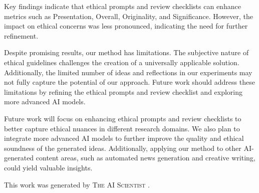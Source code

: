 \documentclass{article} %
\begin{document}
Key findings indicate that ethical prompts and review checklists can enhance metrics such as Presentation, Overall, Originality, and Significance. However, the impact on ethical concerns was less pronounced, indicating the need for further refinement.

Despite promising results, our method has limitations. The subjective nature of ethical guidelines challenges the creation of a universally applicable solution. Additionally, the limited number of ideas and reflections in our experiments may not fully capture the potential of our approach. Future work should address these limitations by refining the ethical prompts and review checklist and exploring more advanced AI models.

Future work will focus on enhancing ethical prompts and review checklists to better capture ethical nuances in different research domains. We also plan to integrate more advanced AI models to further improve the quality and ethical soundness of the generated ideas. Additionally, applying our method to other AI-generated content areas, such as automated news generation and creative writing, could yield valuable insights.

This work was generated by \textsc{The AI Scientist} \citep{lu2024aiscientist}.



\end{document}
